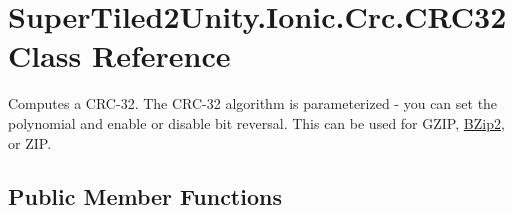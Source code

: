 \hypertarget{class_super_tiled2_unity_1_1_ionic_1_1_crc_1_1_c_r_c32}{}\section{Super\+Tiled2\+Unity.\+Ionic.\+Crc.\+C\+R\+C32 Class Reference}
\label{class_super_tiled2_unity_1_1_ionic_1_1_crc_1_1_c_r_c32}


Computes a C\+R\+C-\/32. The C\+R\+C-\/32 algorithm is parameterized -\/ you can set the polynomial and enable or disable bit reversal. This can be used for G\+Z\+IP, \mbox{\hyperlink{namespace_super_tiled2_unity_1_1_ionic_1_1_b_zip2}{B\+Zip2}}, or Z\+IP.  


\subsection*{Public Member Functions}
